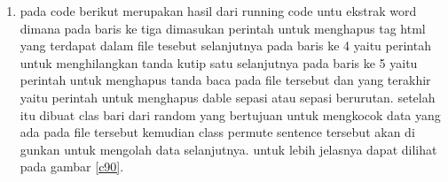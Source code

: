 \begin{enumerate}
\begin{itemize}
\begin{figure}[!htbp]
      \caption{Hasil Matrix Sick}
      \label{c87}
      \end{figure}

\item berikut merupakan hasil dari similaritas kata kata yang di olah menjadi matrix tadi adapun persentase untuk perbandingan setiap katanya yaitu 9 persen untuk kata wash dan clear 7 persen untuk kata bag dan love 48 persen untuk kata motor dan car 12 persen untuk kata sick dan faith dan terakhir yaitu 6 persen untuk kata cycle dan shine. untuk jelasnya dapat di lihat pada gambar \ref{c88}.

\begin{figure}[!htbp]
      \caption{hasil dari lima similaritas}
      \label{c88}
      \end{figure}

\end{itemize}

\item pada code berikut merupakan hasil dari running code untu ekstrak word dimana pada baris ke tiga dimasukan perintah untuk menghapus tag html yang terdapat dalam file tesebut selanjutnya pada baris ke 4 yaitu perintah untuk menghilangkan tanda kutip satu selanjutnya pada baris ke 5 yaitu perintah untuk menghapus tanda baca pada file tersebut dan yang terakhir yaitu perintah untuk menghapus dable sepasi atau sepasi berurutan. setelah itu dibuat clas bari dari random yang bertujuan untuk mengkocok data yang ada pada file tersebut kemudian class permute sentence tersebut akan di gunkan untuk mengolah data selanjutnya. untuk lebih jelasnya dapat dilihat pada gambar \ref{c90}.


\end{enumerate}
